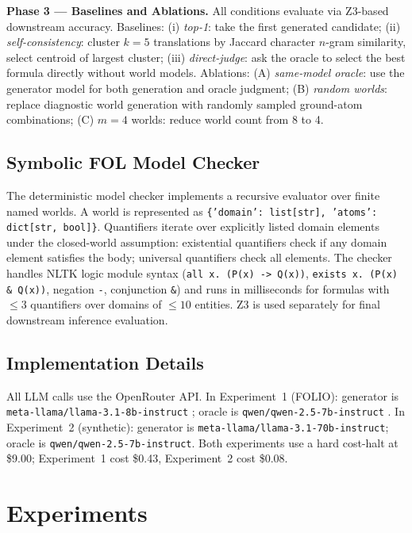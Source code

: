 \documentclass[11pt,letterpaper]{article}
\begin{document}
\textbf{Phase 3 --- Baselines and Ablations.} All conditions evaluate via Z3-based downstream accuracy. Baselines: (i) \emph{top-1}: take the first generated candidate; (ii) \emph{self-consistency}: cluster $k{=}5$ translations by Jaccard character $n$-gram similarity, select centroid of largest cluster; (iii) \emph{direct-judge}: ask the oracle to select the best formula directly without world models. Ablations: (A) \emph{same-model oracle}: use the generator model for both generation and oracle judgment; (B) \emph{random worlds}: replace diagnostic world generation with randomly sampled ground-atom combinations; (C) $m{=}4$ worlds: reduce world count from 8 to 4.

\subsection{Symbolic FOL Model Checker}

The deterministic model checker implements a recursive evaluator over finite named worlds. A world is represented as \texttt{\{'domain': list[str], 'atoms': dict[str, bool]\}}. Quantifiers iterate over explicitly listed domain elements under the closed-world assumption: existential quantifiers check if any domain element satisfies the body; universal quantifiers check all elements. The checker handles NLTK logic module syntax (\texttt{all x. (P(x) -> Q(x))}, \texttt{exists x. (P(x) \& Q(x))}, negation \texttt{-}, conjunction \texttt{\&}) and runs in milliseconds for formulas with $\leq 3$ quantifiers over domains of $\leq 10$ entities. Z3 \citep{deMoura2008} is used separately for final downstream inference evaluation.

\subsection{Implementation Details}

All LLM calls use the OpenRouter API. In Experiment~1 (FOLIO): generator is \texttt{meta-llama/llama-3.1-8b-instruct} \citep{Dubey2024}; oracle is \texttt{qwen/qwen-2.5-7b-instruct} \citep{Qwen2025}. In Experiment~2 (synthetic): generator is \texttt{meta-llama/llama-3.1-70b-instruct}; oracle is \texttt{qwen/qwen-2.5-7b-instruct}. Both experiments use a hard cost-halt at \$9.00; Experiment~1 cost \$0.43, Experiment~2 cost \$0.08.

\section{Experiments}
\label{sec:experiments}
\end{document}
